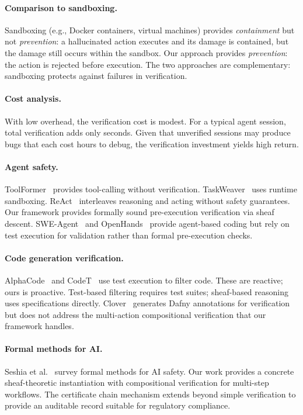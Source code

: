 \documentclass[11pt]{article}
\begin{document}
\paragraph{Comparison to sandboxing.}
Sandboxing (e.g., Docker containers, virtual machines) provides
\emph{containment} but not \emph{prevention}: a hallucinated action
executes and its damage is contained, but the damage still occurs
within the sandbox.  Our approach provides \emph{prevention}: the
action is rejected before execution.  The two approaches are
complementary: sandboxing protects against failures in verification.

\paragraph{Cost analysis.}
With low overhead, the verification cost is modest.
For a typical agent session, total verification
adds only seconds.  Given that unverified sessions may produce
bugs that each cost hours to
debug, the verification investment yields high return.

\paragraph{Agent safety.}
ToolFormer~\cite{Schick2023} provides tool-calling without verification.
TaskWeaver~\cite{Qiao2023} uses runtime sandboxing.
ReAct~\cite{Yao2023} interleaves reasoning and acting without safety
guarantees.  Our framework provides formally sound pre-execution
verification via sheaf descent.  SWE-Agent~\cite{Yang2024} and
OpenHands~\cite{Wang2024} provide agent-based coding but rely on
test execution for validation rather than formal pre-execution checks.

\paragraph{Code generation verification.}
AlphaCode~\cite{Li2022} and CodeT~\cite{Chen2023} use test execution
to filter code.  These are reactive; ours is proactive.  Test-based
filtering requires test suites; sheaf-based reasoning uses specifications
directly.  Clover~\cite{Sun2024} generates Dafny annotations for
verification but does not address the multi-action compositional
verification that our framework handles.

\paragraph{Formal methods for AI.}
Seshia et al.~\cite{Seshia2022} survey formal methods for AI safety.
Our work provides a concrete sheaf-theoretic instantiation with
compositional verification for multi-step workflows.  The certificate
chain mechanism extends beyond simple verification to provide an
auditable record suitable for regulatory compliance.
\end{document}
